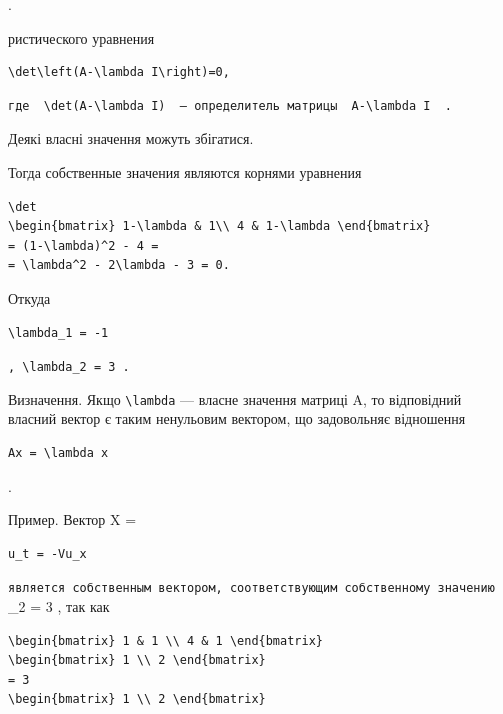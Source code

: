\documentclass[
  ukrainian,
]{article}
\begin{document}
.

ристического уравнения

\begin{verbatim}
\det\left(A-\lambda I\right)=0,
\end{verbatim}

\begin{verbatim}
где  \det(A-\lambda I)  — определитель матрицы  A-\lambda I  .
\end{verbatim}

Деякі власні значення можуть збігатися.

Тогда собственные значения являются корнями уравнения

\begin{verbatim}
\det
\begin{bmatrix} 1-\lambda & 1\\ 4 & 1-\lambda \end{bmatrix}
= (1-\lambda)^2 - 4 =
= \lambda^2 - 2\lambda - 3 = 0.
\end{verbatim}

Откуда

\begin{verbatim}
\lambda_1 = -1
\end{verbatim}

\texttt{,\ \textquotesingle{}\textbackslash{}lambda\_2\ =\ 3\textquotesingle{}\ .}

Визначення. Якщо \texttt{\textbackslash{}lambda} --- власне значення
матриці A, то відповідний власний вектор є таким ненульовим вектором, що
задовольняє відношення

\begin{verbatim}
Ax = \lambda x
\end{verbatim}

.

Пример. Вектор X =

\begin{verbatim}
u_t = -Vu_x
\end{verbatim}

\texttt{является\ собственным\ вектором,\ соответствующим\ собственному\ значению}
\lambda\_2 = 3 , так как

\begin{verbatim}
\begin{bmatrix} 1 & 1 \\ 4 & 1 \end{bmatrix}
\begin{bmatrix} 1 \\ 2 \end{bmatrix}
= 3
\begin{bmatrix} 1 \\ 2 \end{bmatrix}
\end{verbatim}
\end{document}
